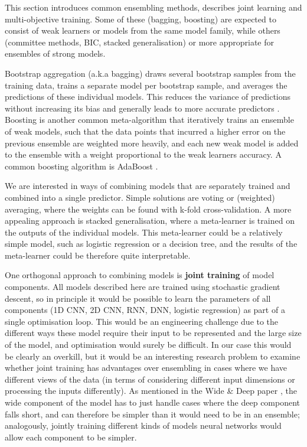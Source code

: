 This section  introduces common ensembling methods, describes joint learning and multi-objective training.
Some of these (bagging, boosting)  are expected to consist of weak learners or models from the same model family, while others (committee methods, BIC, stacked generalisation) or more appropriate for ensembles of strong models.

Bootstrap aggregation (a.k.a bagging)   draws several bootstrap samples  from the training data,  trains a separate model per bootstrap sample,  and averages the predictions of these individual models.  This reduces the variance of predictions without increasing its bias and generally leads to  more accurate predictors \cite{bagging}.
Boosting is another common meta-algorithm that iteratively trains an ensemble of weak models, such that the data points that incurred a higher error on the previous ensemble are weighted more heavily, and each new weak model is added to the ensemble with a weight proportional to the weak learners accuracy.
A common boosting algorithm is AdaBoost \cite{adaboost}.

We are interested in ways of combining models that are separately trained and combined into a single predictor.
Simple solutions are voting or (weighted) averaging, where the weights can be found with k-fold cross-validation.
A more appealing approach is stacked generalisation, where a meta-learner is trained on the outputs of the individual models.
This meta-learner could be a relatively simple model, such as logistic regression or a decision tree, and the results of the meta-learner could be therefore quite interpretable.

One orthogonal approach to combining models is \textbf{joint training} of model components.
All models described here are trained using stochastic gradient descent, so in principle it would be possible to learn the parameters of all components (1D CNN, 2D CNN, RNN, DNN, logistic regression) as part of a single optimisation loop.
This would be an engineering challenge due to the different ways these model require their input to be represented and the large size of the model, and optimisation would surely be difficult.
In our case this would be clearly an overkill, but it would be an interesting research problem to examine whether joint training has advantages over ensembling in cases where we have different views of the data (in terms of considering different input dimensions or processing the inputs differently).
As mentioned in the Wide \& Deep paper \cite{wide_deep}, the wide component of the model has to just handle cases where the deep component falls short, and can therefore be simpler than it would need to be in an ensemble; analogously, jointly training different kinds of models neural networks would allow each component to be simpler.

